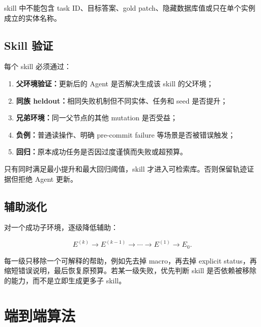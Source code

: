 \documentclass[11pt,a4paper,fontset=fandol]{ctexart}
\newcommand{\Etarget}{E_0}
\begin{document}
skill 中不能包含 task ID、目标答案、gold patch、隐藏数据库值或只在单个实例成立的实体名称。

\subsection{Skill 验证}

每个 skill 必须通过：

\begin{enumerate}
  \item \textbf{父环境验证：}更新后的 Agent 是否解决生成该 skill 的父环境；
  \item \textbf{同族 heldout：}相同失败机制但不同实体、任务和 seed 是否提升；
  \item \textbf{兄弟环境：}同一父节点的其他 mutation 是否受益；
  \item \textbf{负例：}普通读操作、明确 pre-commit failure 等场景是否被错误触发；
  \item \textbf{回归：}原本成功任务是否因过度谨慎而失败或超预算。
\end{enumerate}

只有同时满足最小提升和最大回归阈值，skill 才进入可检索库。否则保留轨迹证据但拒绝 Agent 更新。

\subsection{辅助淡化}

对一个成功子环境，逐级降低辅助：

\begin{equation}
E^{(k)}\rightarrow E^{(k-1)}\rightarrow\cdots\rightarrow E^{(1)}\rightarrow\Etarget.
\end{equation}

每一级只移除一个可解释的帮助，例如先去掉 macro，再去掉 explicit status，再缩短错误说明，最后恢复原预算。若某一级失败，优先判断 skill 是否依赖被移除的能力，而不是立即生成更多子 skill。

\section{端到端算法}
\end{document}
